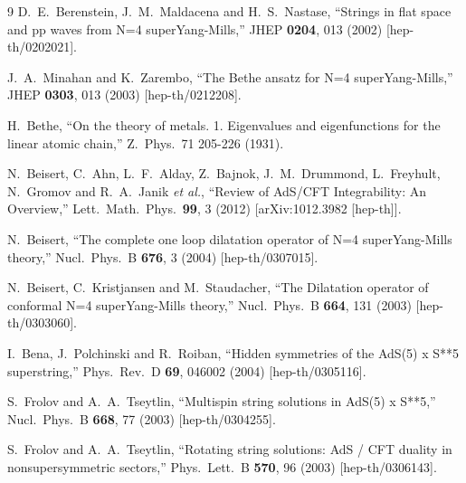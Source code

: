 \documentclass[a4paper,11pt]{article}
\numberwithin{equation}{section}
\begin{document}
\begin{thebibliography} {9}
  D.~E.~Berenstein, J.~M.~Maldacena and H.~S.~Nastase,
  ``Strings in flat space and pp waves from N=4 superYang-Mills,''
  JHEP {\bf 0204}, 013 (2002)
  [hep-th/0202021].

  J.~A.~Minahan and K.~Zarembo,
  ``The Bethe ansatz for N=4 superYang-Mills,''
  JHEP {\bf 0303}, 013 (2003)
  [hep-th/0212208].

  H.~Bethe, 
  ``On the theory of metals. 1. Eigenvalues and eigenfunctions for the linear atomic chain,''
  Z.\ Phys.\ 71 205-226 (1931).

  N.~Beisert, C.~Ahn, L.~F.~Alday, Z.~Bajnok, J.~M.~Drummond, L.~Freyhult, N.~Gromov and R.~A.~Janik {\it et al.},
  ``Review of AdS/CFT Integrability: An Overview,''
  Lett.\ Math.\ Phys.\ {\bf 99}, 3 (2012)
  [arXiv:1012.3982 [hep-th]].

  N.~Beisert,
  ``The complete one loop dilatation operator of N=4 superYang-Mills theory,''
  Nucl.\ Phys.\ B {\bf 676}, 3 (2004)
  [hep-th/0307015].

  N.~Beisert, C.~Kristjansen and M.~Staudacher,
  ``The Dilatation operator of conformal N=4 superYang-Mills theory,''
  Nucl.\ Phys.\ B {\bf 664}, 131 (2003)
  [hep-th/0303060].

  I.~Bena, J.~Polchinski and R.~Roiban,
  ``Hidden symmetries of the AdS(5) x S**5 superstring,''
  Phys.\ Rev.\ D {\bf 69}, 046002 (2004)
  [hep-th/0305116].

  S.~Frolov and A.~A.~Tseytlin,
  ``Multispin string solutions in AdS(5) x S**5,''
  Nucl.\ Phys.\ B {\bf 668}, 77 (2003)
  [hep-th/0304255].

  S.~Frolov and A.~A.~Tseytlin,
  ``Rotating string solutions: AdS / CFT duality in nonsupersymmetric sectors,''
  Phys.\ Lett.\ B {\bf 570}, 96 (2003)
  [hep-th/0306143].


\end{thebibliography}
\end{document}

